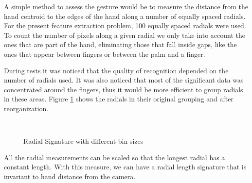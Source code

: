 \documentclass[12pt,fleqn]{book} %
\begin{document}
A simple method to assess the gesture would be to measure the distance from the hand centroid to the edges of the hand along a number of equally spaced radials. For the present feature extraction problem, 100 equally spaced radials were used. To count the number of pixels along a given radial we only take into account the ones that are part of the hand, eliminating those that fall inside gaps, like the ones that appear between fingers or between the palm and a finger.
\bigskip

During tests it was noticed that the quality of recognition depended on the number of radials used. It was also noticed that most of the significant data was concentrated around the fingers, thus it would be more efficient to group radials in these areas. Figure \ref{fig:radial_bins} shows the radials in their original grouping and after reorganization.
\bigskip
\begin{figure}[h]
\begin{dBox}
\centering
  \mbox{
   }
   \caption{Radial Signature with different bin sizes \label{fig:radial_bins} }   
\end{dBox}   
\end{figure}

All the radial measurements can be scaled so that the longest radial has a constant length. With this measure, we can have a radial length signature that is invariant to hand distance from the camera.
\end{document}
